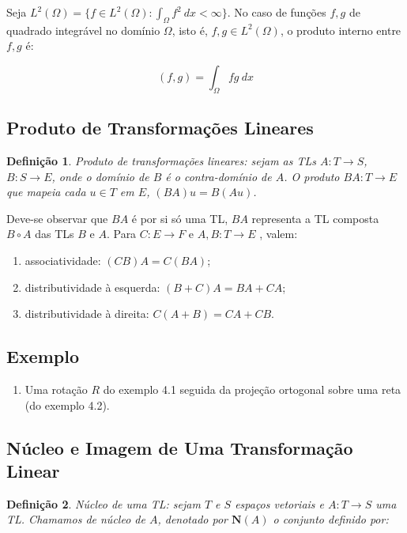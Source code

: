 \documentclass[a4paper,portuguese,9pt]{extarticle}
\newtheorem*{definition}{Definição}
\begin{document}
\begin{multicols*}{2}
Seja $L^2 (\Omega)= \{f \in L^2 (\Omega): \int_{\Omega} f^2 \: dx < \infty \} $. No caso de funções $f,g$ de quadrado integrável no domínio $\Omega$, isto é, $f,g \in L^{2}(\Omega)$, o produto interno entre $f,g$ é: 

\begin{equation*}
    (f,g)=\int_{\Omega} fg \: dx
\end{equation*}

\subsection{Produto de Transformações Lineares}

\begin{definition}
Produto de transformações lineares: sejam as TLs $A: T \rightarrow S$, $B: S \rightarrow E$, onde o domínio de $B$ é o contra-domínio de $A$. O produto $BA: T \rightarrow E$ que mapeia cada $u \in T$ em $E$, $(BA)u=B(Au)$.
\end{definition}

Deve-se observar que $BA$ é por si só uma TL, $BA$ representa a TL composta $B \circ A$ das TLs $B$ e $A$. Para $C: E \rightarrow F$ e $A,B:T \rightarrow E$ , valem:

\begin{enumerate}[label=(\roman*)]
    \item associatividade: $(CB)A = C(BA)$;
    \item distributividade à esquerda: $(B+C)A = BA + CA$;
    \item distributividade à direita: $C(A+B) = CA + CB$.
\end{enumerate}

\subsection{Exemplo}

\begin{enumerate}
    \item Uma rotação $R$  do exemplo 4.1 seguida da projeção ortogonal sobre uma reta (do exemplo 4.2). 
\end{enumerate}

\subsection{Núcleo e Imagem de Uma Transformação Linear}

\begin{definition}
Núcleo de uma TL: sejam $T$ e $S$ espaços vetoriais e $A:T \rightarrow S$ uma TL. Chamamos de núcleo de $A$, denotado por $\mathbf{N}(A)$ o conjunto definido por:


\end{definition}
\end{multicols*}
\end{document}
